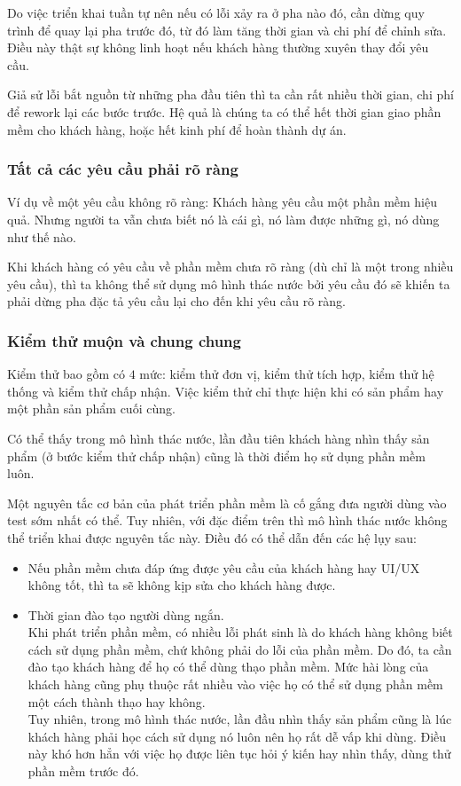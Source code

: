 \documentclass[14pt]{extarticle}
\begin{document}
Do việc triển khai tuần tự nên nếu có lỗi xảy ra ở pha nào đó, cần
dừng quy trình để quay lại pha trước đó, từ đó làm tăng thời gian và chi phí
để chỉnh sửa. Điều này thật sự không linh hoạt nếu khách hàng thường xuyên
thay đổi yêu cầu.

Giả sử lỗi bắt nguồn từ những pha đầu tiên thì ta cần rất nhiều thời gian,
chi phí để rework lại các bước trước.
Hệ quả là chúng ta có thể hết thời gian giao phần mềm cho khách hàng, hoặc
hết kinh phí để hoàn thành dự án.

\subsubsection*{Tất cả các yêu cầu phải rõ ràng} \label{sec:clear-req}

Ví dụ về một yêu cầu không rõ ràng: Khách hàng yêu cầu một phần mềm hiệu quả.
Nhưng người ta vẫn chưa biết nó là cái gì, nó làm được những gì, nó dùng
như thế nào.

Khi khách hàng có yêu cầu về phần mềm chưa rõ ràng (dù chỉ là một trong
nhiều yêu cầu), thì ta không thể sử dụng mô hình thác nước bởi yêu cầu đó
sẽ khiến ta phải dừng pha đặc tả yêu cầu lại cho đến khi yêu cầu rõ ràng.\\


\subsubsection*{Kiểm thử muộn và chung chung}
Kiểm thử bao gồm có $4$ mức: kiểm thử đơn vị, kiểm thử tích hợp, kiểm thử
hệ thống và kiểm thử chấp nhận. Việc kiểm thử chỉ thực hiện khi có sản phẩm
hay một phần sản phẩm cuối cùng.

Có thể thấy trong mô hình thác nước, lần đầu tiên khách hàng nhìn thấy sản phẩm
(ở bước kiểm thử chấp nhận) cũng là thời điểm họ sử dụng phần mềm luôn.

Một nguyên tắc cơ bản của phát triển phần mềm là cố gắng đưa người dùng vào
test sớm nhất có thể. Tuy nhiên, với đặc điểm trên thì mô hình thác nước
không thể triển khai được nguyên tắc này. Điều đó có thể dẫn đến các
hệ lụy sau:
\begin{itemize}
  \item Nếu phần mềm chưa đáp ứng được yêu cầu của khách hàng hay
        UI/UX không tốt, thì ta sẽ không kịp sửa cho khách hàng được.
  \item Thời gian đào tạo người dùng ngắn.\\
        Khi phát triển phần mềm, có nhiều lỗi phát sinh là do khách hàng
        không biết cách sử dụng phần mềm, chứ không phải do lỗi của phần mềm.
        Do đó, ta cần đào tạo khách hàng để họ có thể dùng thạo phần mềm.
        Mức hài lòng của khách hàng cũng phụ thuộc rất nhiều vào việc họ
        có thể sử dụng phần mềm một cách thành thạo hay không.\\
        Tuy nhiên, trong mô hình thác nước, lần đầu nhìn thấy sản phẩm cũng
        là lúc khách hàng phải học cách sử dụng nó luôn nên họ rất dễ vấp
        khi dùng. Điều này khó hơn hẳn với việc họ được liên tục hỏi ý kiến
        hay nhìn thấy, dùng thử phần mềm trước đó.
\end{itemize}
\end{document}
